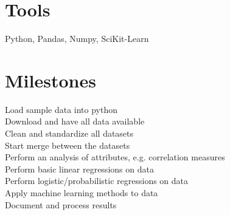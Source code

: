 \documentclass[sigconf, 11pt]{acmart}
\begin{document}
\section{Tools}
Python, Pandas, Numpy, SciKit-Learn
\section{Milestones}
Load sample data into python \\
Download and have all data available \\
Clean and standardize all datasets \\
Start merge between the datasets \\
Perform an analysis of attributes, e.g. correlation measures\\
Perform basic linear regressions on data \\
Perform logistic/probabilistic regressions on data \\
Apply machine learning methods to data \\
Document and process results \\


\end{document}
